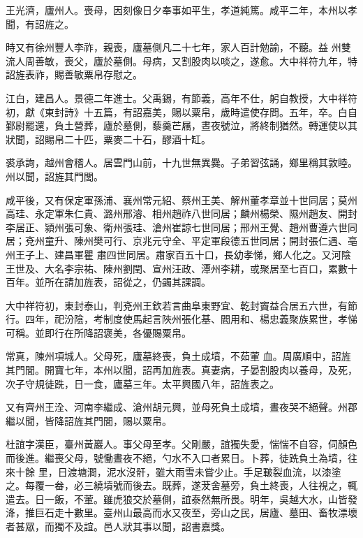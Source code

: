 \begin{pinyinscope}
 王光濟，廬州人。喪母，因刻像日夕奉事如平生，孝道純篤。咸平二年，本州以孝聞，有詔旌之。



 時又有徐州豐人李祚，親喪，廬墓側凡二十七年，家人百計勉諭，不聽。益
 州雙流人周善敏，喪父，廬於墓側。母病，又割股肉以啖之，遂愈。大中祥符九年，特詔旌表祚，賜善敏粟帛存慰之。



 江白，建昌人。景德二年進士。父禹錫，有節義，高年不仕，躬自教授，大中祥符初，獻《東封詩》十五篇，有詔嘉美，賜以粟帛，歲時遣使存問。五年，卒。白自鄞尉罷還，負土營葬，廬於墓側，藜羹芒屩，晝夜號泣，將終制猶然。轉運使以其狀聞，詔賜帛二十匹，粟麥二十石，醪酒十缸。



 裘承詢，越州會稽人。居雲門山前，十九世無異爨。子弟習弦誦，鄉里稱其敦睦。州以聞，詔旌其門閭。



 咸平後，又有保定軍孫浦、襄州常元紹、蔡州王美、解州董孝章並十世同居；莫州高珪、永定軍朱仁貴、潞州邢濬、相州趙祚八世同居；麟州楊榮、隰州趙友、開封李居正、潁州張可象、衛州張珪、滄州崔諒七世同居；邢州王覺、趙州曹遵六世同居；兗州童升、陳州樊可行、京兆元守全、平定軍段德五世同居；開封張仁遇、亳州王子上、建昌軍瞿
 肅四世同居。肅家百五十口，長幼孝悌，鄉人化之。又河陰王世及、大名李宗祐、陳州劉閏、宣州汪政、潭州李耕，或聚居至七百口，累數十百年。並所在請加旌表，詔從之，仍蠲其課調。



 大中祥符初，東封泰山，判兗州王欽若言曲阜東野宜、乾封竇益合居五六世，有節行。四年，祀汾陰，考制度使馬起言陜州張化基、閻用和、楊忠義聚族累世，孝悌可稱。並即行在所降詔褒美，各優賜粟帛。



 常真，陳州項城人。父母死，廬墓終喪，負土成墳，不茹葷
 血。周廣順中，詔旌其門閭。開寶七年，本州以聞，詔再加旌表。真妻病，子晏割股肉以養母，及死，次子守規徒跣，日一食，廬墓三年。太平興國八年，詔旌表之。



 又有齊州王洤、河南李繼成、滄州胡元興，並母死負土成墳，晝夜哭不絕聲。州郡繼以聞，皆降詔旌其門閭，賜以粟帛。



 杜誼字漢臣，臺州黃巖人。事父母至孝。父剛嚴，誼獨失愛，惴惴不自容，伺顏色而後進。繼喪父母，號慟晝夜不絕，勺水不入口者累日。卜葬，徒跣負土為墳，往來十餘
 里，日渡塘澗，泥水沒骭，雖大雨雪未嘗少止。手足皸裂血流，以漆塗之。每覆一畚，必三繞墳號而後去。既葬，遂茇舍墓旁，負土終喪，人往視之，輒遣去。日一飯，不葷。雖虎狼交於墓側，誼泰然無所畏。明年，吳越大水，山皆發洚，推巨石走十數里。臺州山最高而水又夜至，旁山之民，居廬、墓田、畜牧漂壞者甚眾，而獨不及誼。邑人狀其事以聞，詔書嘉獎。




\end{pinyinscope}
